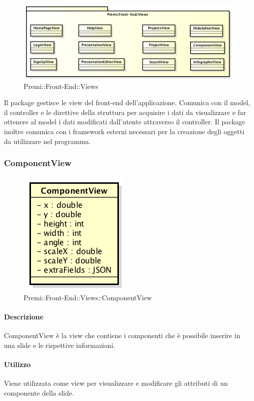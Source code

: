\begin{figure}[h]
	\centering
	\includegraphics[width=0.7\linewidth]{img/premi_front_end_views}
	\caption[Premi::Front-End::Views]{Premi::Front-End::Views}
\end{figure}
Il package gestisce le view del front-end dell'applicazione. Comunica con il model, il controller e le direttive della struttura per acquisire i dati da visualizzare e far ottenere al model i dati modificati dall'utente attraverso il controller. Il package inoltre comunica con i framework esterni necessari per la creazione degli oggetti da utilizzare nel programma.

\subsubsection{ComponentView}
	\begin{figure}[h]
		\centering
		\includegraphics[width=0.4\linewidth]{img/premi_front_end_views_componentview}
		\caption[Premi::Front-End::Views::ComponentView]{Premi::Front-End::Views::ComponentView}
	\end{figure}
	
	\paragraph{Descrizione}
	ComponentView è la view che contiene i componenti che è possibile inserire in una slide e le rispettive informazioni.
	
	\paragraph{Utilizzo}
	Viene utilizzata come view per visualizzare e modificare gli attributi di un componente della slide.
	
